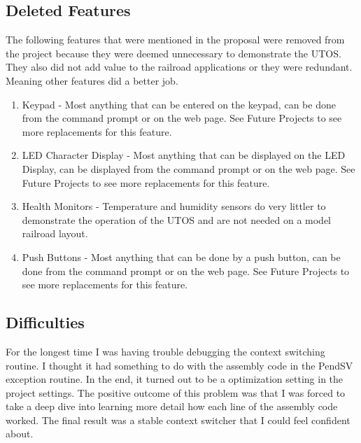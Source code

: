 \documentclass[acmlarge,screen]{acmart}
\begin{document}
\subsection{Deleted Features}
The following features that were mentioned in the proposal were removed from the project because they were deemed unnecessary to demonstrate the UTOS. They also did not add value to the railroad applications or they were redundant. Meaning other features did a better job.\\
\begin{enumerate}
\item Keypad - Most anything that can be entered on the keypad, can be done from the command prompt or on the web page. See Future Projects to see more replacements for this feature.
\item LED Character Display - Most anything that can be displayed on the LED Display, can be displayed from the command prompt or on the web page. See Future Projects to see more replacements for this feature.
\item Health Monitors - Temperature and humidity sensors do very littler to demonstrate the operation of the UTOS and are not needed on a model railroad layout.
\item Push Buttons - Most anything that can be done by a push button, can be done from the command prompt or on the web page. See Future Projects to see more replacements for this feature.
\end{enumerate}
\subsection{Difficulties}
For the longest time I was having trouble debugging the context switching routine. I thought it had something to do with the assembly code in the PendSV exception routine. In the end, it turned out to be a optimization setting in the project settings. The positive outcome of this problem was that I was forced to take a deep dive into learning more detail how each line of the assembly code worked. The final result was a stable context switcher that I could feel confident about.\\
\end{document}
